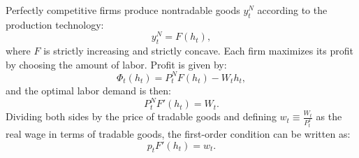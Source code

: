 Perfectly competitive firms produce nontradable goods $y^N_t$ according to the production technology:
\begin{equation}
    \label{eq:production}
    y^N_t = F(h_t),
\end{equation}
where $F$ is strictly increasing and strictly concave. Each firm maximizes its profit by choosing the amount of labor. Profit is given by:
\begin{equation}
    \label{eq:profit}
    \Phi_t(h_t) = P^N_t F(h_t) - W_t h_t,
\end{equation}
and the optimal labor demand is then:
\begin{equation*}
    P^N_t F'(h_t) = W_t.
\end{equation*}
Dividing both sides by the price of tradable goods and defining $w_t \equiv \frac{W_t}{P^T_t}$ as the real wage in terms of tradable goods, the first-order condition can be written as:
\begin{equation}
    \label{eq:firm-FOC}
    p_t F'(h_t) = w_t.
\end{equation}